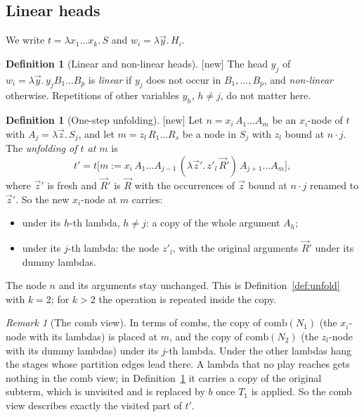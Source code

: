 \documentclass[11pt]{article}
\newcommand{\suc}[2]{#1{\cdot}#2}
\newcommand{\comb}{\mathrm{comb}}
\newcommand{\New}{\textsf{[new]}}
\theoremstyle{plain}
\theoremstyle{definition}
\newtheorem{definition}[theorem]{Definition}
\theoremstyle{remark}
\newtheorem{remark}[theorem]{Remark}
\begin{document}
\subsection{Linear heads}

We write $t=\lambda x_1\dots x_k.\,S$ and $w_i=\lambda\vec y.\,H_i$.

\begin{definition}[Linear and non-linear heads]\label{def:linear}
\New{} The head $y_j$ of $w_i=\lambda\vec y.\,y_j B_1\dots B_p$ is
\emph{linear} if $y_j$ does not occur in $B_1,\dots,B_p$, and
\emph{non-linear} otherwise.  Repetitions of other variables $y_h$,
$h\ne j$, do not matter here.
\end{definition}

\begin{definition}[One-step unfolding]\label{def:onestep}
\New{} Let $n=x_i\,A_1\dots A_m$ be an $x_i$-node of $t$ with
$A_j=\lambda\vec z.\,S_j$, and let $m=z_l\,R_1\dots R_s$ be a node in
$S_j$ with $z_l$ bound at $\suc nj$.  The \emph{unfolding of $t$ at
$m$} is
\[
t'=t\bigl[m:=x_i\,A_1\dots A_{j-1}\,(\lambda\vec z'.\,z'_l\,\vec R')\,
A_{j+1}\dots A_m\bigr],
\]
where $\vec z'$ is fresh and $\vec R'$ is $\vec R$ with the occurrences of
$\vec z$ bound at $\suc nj$ renamed to $\vec z'$.  So the new $x_i$-node
at $m$ carries:
\begin{itemize}
\item under its $h$-th lambda, $h\ne j$: a copy of the whole argument
  $A_h$;
\item under its $j$-th lambda: the node $z'_l$, with the original
  arguments $\vec R'$ under its dummy lambdas.
\end{itemize}
The node $n$ and its arguments stay unchanged.  This is
Definition~\ref{def:unfold} with $k=2$; for $k>2$ the operation is
repeated inside the copy.
\end{definition}

\begin{remark}[The comb view]
In terms of combs, the copy of $\comb(N_1)$ (the $x_i$-node with its
lambdas) is placed at $m$, and the copy of $\comb(N_2)$ (the $z_l$-node
with its dummy lambdas) under its $j$-th lambda.  Under the other
lambdas hang the stages whose partition edges lead there.  A lambda that
no play reaches gets nothing in the comb view; in
Definition~\ref{def:onestep} it carries a copy of the original
subterm, which is unvisited and is replaced by $b$ once $T_1$ is
applied.  So the comb view describes exactly the visited part of $t'$.
\end{remark}
\end{document}
